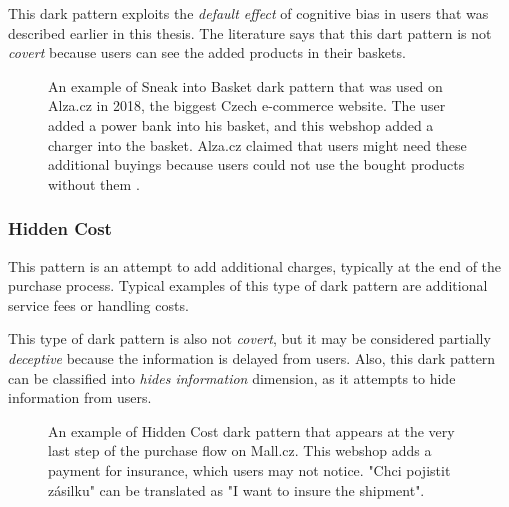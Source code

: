         This dark pattern exploits the \emph{default effect} of cognitive bias in users that was described earlier in this thesis. The literature says that this dart pattern is not \emph{covert} because users can see the added products in their baskets.

        \begin{figure}[ht]
            \centering
            \caption{An example of Sneak into Basket dark pattern that was used on Alza.cz in 2018, the biggest Czech e-commerce website. The user added a power bank into his basket, and this webshop added a charger into the basket. Alza.cz claimed that users might need these additional buyings because users could not use the bought products without them \cite{alza-sneak-into-basket-idnes}.}
            \label{fig:alza-sneak-into-basket}
        \end{figure}

        \subsubsection{Hidden Cost}
        This pattern is an attempt to add additional charges, typically at the end of the purchase process. Typical examples of this type of dark pattern are additional service fees or handling costs. 
        
        This type of dark pattern is also not \emph{covert}, but it may be considered partially \emph{deceptive} because the information is delayed from users. Also, this dark pattern can be classified into \emph{hides information} dimension, as it attempts to hide information from users.
        \begin{figure}[ht]
            \centering
            \caption{An example of Hidden Cost dark pattern that appears at the very last step of the purchase flow on Mall.cz. This webshop adds a payment for insurance, which users may not notice. "Chci pojistit zásilku" can be translated as "I want to insure the shipment".}
            \label{fig:hidden-cost-mall}
        \end{figure}

